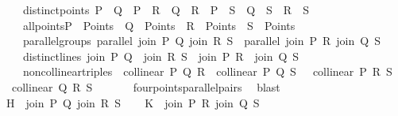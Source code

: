 \begin{isabellebody}
\ \ \ \ distinct{\isacharunderscore}{\kern0pt}points{\isacharcolon}{\kern0pt}\ {\isachardoublequoteopen}P\ {\isasymnoteq}\ Q\ {\isasymand}\ P\ {\isasymnoteq}\ R\ {\isasymand}\ Q\ {\isasymnoteq}\ R\ {\isasymand}\ P\ {\isasymnoteq}\ S\ {\isasymand}\ Q\ {\isasymnoteq}\ S\ {\isasymand}\ R\ {\isasymnoteq}\ S{\isachardoublequoteclose}\ \ \isanewline
\ \ \ \ all{\isacharunderscore}{\kern0pt}points{\isacharcolon}{\kern0pt}{\isachardoublequoteopen}P\ {\isasymin}\ Points\ {\isasymand}\ Q\ {\isasymin}\ Points\ {\isasymand}\ R\ {\isasymin}\ Points\ {\isasymand}\ S\ {\isasymin}\ Points{\isachardoublequoteclose}\ \ \isanewline
\ \ \ \ parallel{\isacharunderscore}{\kern0pt}groups{\isacharcolon}{\kern0pt}\ {\isachardoublequoteopen}parallel\ {\isacharparenleft}{\kern0pt}join\ P\ Q{\isacharparenright}{\kern0pt}\ {\isacharparenleft}{\kern0pt}join\ R\ S{\isacharparenright}{\kern0pt}\ {\isasymand}\ parallel\ {\isacharparenleft}{\kern0pt}join\ P\ R{\isacharparenright}{\kern0pt}\ {\isacharparenleft}{\kern0pt}join\ Q\ S{\isacharparenright}{\kern0pt}{\isachardoublequoteclose}\ \isanewline
\ \ \ \ distinct{\isacharunderscore}{\kern0pt}lines{\isacharcolon}{\kern0pt}\ {\isachardoublequoteopen}{\isacharparenleft}{\kern0pt}join\ P\ Q{\isacharparenright}{\kern0pt}\ {\isasymnoteq}\ {\isacharparenleft}{\kern0pt}join\ R\ S{\isacharparenright}{\kern0pt}\ {\isasymand}\ {\isacharparenleft}{\kern0pt}join\ P\ R{\isacharparenright}{\kern0pt}\ {\isasymnoteq}\ {\isacharparenleft}{\kern0pt}join\ Q\ S{\isacharparenright}{\kern0pt}{\isachardoublequoteclose}\ \isanewline
\ \ \ \ non{\isacharunderscore}{\kern0pt}collinear{\isacharunderscore}{\kern0pt}triples{\isacharcolon}{\kern0pt}\ {\isachardoublequoteopen}{\isasymnot}\ collinear\ P\ Q\ R\ {\isasymand}{\isasymnot}\ collinear\ P\ Q\ S\ {\isasymand}\ {\isasymnot}\ collinear\ P\ R\ S\ {\isasymand}\ {\isasymnot}\ collinear\ Q\ R\ S{\isachardoublequoteclose}\ \isanewline
\ \ \ \ \isamarkupfalse%
\ four{\isacharunderscore}{\kern0pt}points{\isacharunderscore}{\kern0pt}parallel{\isacharunderscore}{\kern0pt}pairs\ \isamarkupfalse%
\ blast\isanewline
\isanewline
\ \ \isamarkupfalse%
\ {\isacharquery}{\kern0pt}H\ {\isacharequal}{\kern0pt}\ {\isachardoublequoteopen}{\isacharbraceleft}{\kern0pt}join\ P\ Q{\isacharcomma}{\kern0pt}\ join\ R\ S{\isacharbraceright}{\kern0pt}{\isachardoublequoteclose}\isanewline
\ \ \isamarkupfalse%
\ {\isacharquery}{\kern0pt}K\ {\isacharequal}{\kern0pt}\ {\isachardoublequoteopen}{\isacharbraceleft}{\kern0pt}join\ P\ R{\isacharcomma}{\kern0pt}\ join\ Q\ S{\isacharbraceright}{\kern0pt}{\isachardoublequoteclose}\isanewline

\end{isabellebody}
